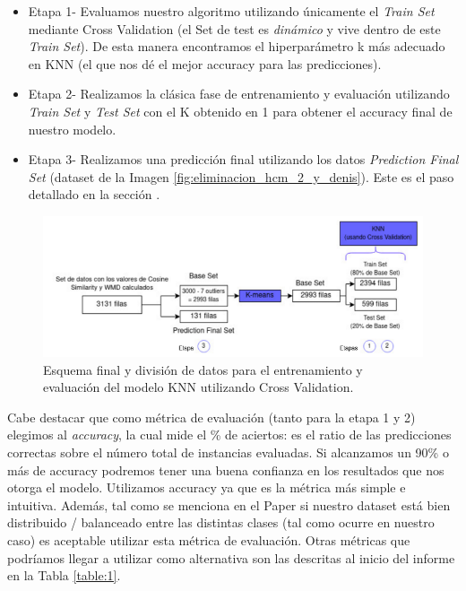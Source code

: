 \documentclass[12pt,a4paper]{article}
\begin{document}
\begin{sloppypar}
\begin{itemize}
\item Etapa 1- Evaluamos nuestro algoritmo utilizando únicamente el \textit{Train Set} mediante Cross Validation (el Set de test es \textit{dinámico} y vive dentro de este \textit{Train Set}). De esta manera encontramos el hiperparámetro k más adecuado en KNN (el que nos dé el mejor accuracy para las predicciones).

\item Etapa 2- Realizamos la clásica fase de entrenamiento y evaluación utilizando \textit{Train Set} y \textit{Test Set} con el K obtenido en 1 para obtener el accuracy final de nuestro modelo. 

\item Etapa 3- Realizamos una predicción final utilizando los datos \textit{Prediction Final Set} (dataset de la Imagen \ref{fig:eliminacion_hcm_2_y_denis}). Este es el paso detallado en la sección \textit{}.

\end{itemize}

\begin{figure}[H]   
\centering
\includegraphics[width=1\textwidth]{images/implementacion_5/esquema_2_cross_val.png}
\captionsetup{justification=centering,margin=1cm}
\caption{Esquema final y división de datos para el entrenamiento y evaluación del modelo KNN utilizando Cross Validation.}
\label{fig:esquema_2_cross_val}
\end{figure}

Cabe destacar que como métrica de evaluación (tanto para la etapa 1 y 2) elegimos al \textit{accuracy}, la cual mide el \% de aciertos: es el ratio de las predicciones correctas sobre el número total de instancias evaluadas. Si alcanzamos un 90\% o más de accuracy podremos tener una buena confianza en los resultados que nos otorga el modelo. Utilizamos accuracy ya que es la métrica más simple e intuitiva. Además, tal como se menciona en el Paper\cite{Implem_4} si nuestro dataset está bien distribuido / balanceado entre las distintas clases (tal como ocurre en nuestro caso) es aceptable utilizar esta métrica de evaluación. Otras métricas que podríamos llegar a utilizar como alternativa son las descritas al inicio del informe en la Tabla \ref{table:1}. 


\end{sloppypar}
\end{document}
